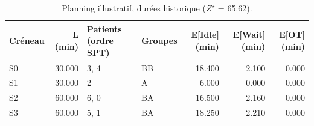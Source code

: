 \begin{table}[htbp]
\caption{Planning illustratif, durées historique ($Z^\star$ = 65.62).}
\label{tab:planning-historique}
\begin{tabular}{lrllrrr}
\toprule
Créneau & L (min) & Patients (ordre SPT) & Groupes & E[Idle] (min) & E[Wait] (min) & E[OT] (min) \\
\midrule
S0 & 30.000 & 3, 4 & BB & 18.400 & 2.100 & 0.000 \\
S1 & 30.000 & 2 & A & 6.000 & 0.000 & 0.000 \\
S2 & 60.000 & 6, 0 & BA & 16.500 & 2.160 & 0.000 \\
S3 & 60.000 & 5, 1 & BA & 18.250 & 2.210 & 0.000 \\
\bottomrule
\end{tabular}
\end{table}
